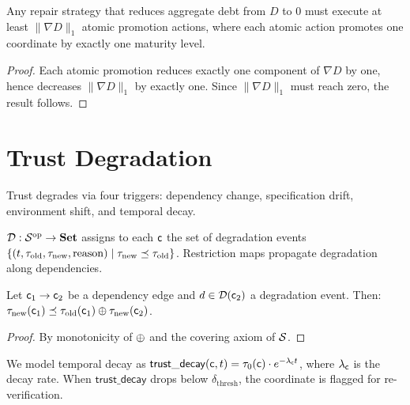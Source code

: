 \documentclass[11pt]{article}
\newcommand{\TrustDecay}{\mathsf{trust\_decay}}
\newcommand{\DebtThreshold}{\delta_{\mathrm{thresh}}}
\begin{document}
\begin{lemma}\label{lem:repair-lower}
Any repair strategy that reduces aggregate debt from $D$ to $0$ must
execute at least $\|\nabla D\|_1$ atomic promotion actions, where each
atomic action promotes one coordinate by exactly one maturity level.
\end{lemma}

\begin{proof}
Each atomic promotion reduces exactly one component of $\nabla D$ by
one, hence decreases $\|\nabla D\|_1$ by exactly one.  Since
$\|\nabla D\|_1$ must reach zero, the result follows.
\end{proof}



\section{Trust Degradation}\label{sec:trust-degradation}

Trust degrades via four triggers: dependency change, specification
drift, environment shift, and temporal decay.

\begin{definition}\label{def:degrade}
$\mathcal{D} : \mathcal{S}^{\mathrm{op}} \to \mathbf{Set}$ assigns to each
$\mathsf{c}$ the set of degradation events
$\{(t, \tau_{\mathrm{old}}, \tau_{\mathrm{new}}, \mathrm{reason})
\mid \tau_{\mathrm{new}} \preceq \tau_{\mathrm{old}}\}$.
Restriction maps propagate degradation along dependencies.
\end{definition}

\begin{theorem}\label{thm:degrade-prop}
Let $\mathsf{c}_1 \to \mathsf{c}_2$ be a dependency edge and
$d \in \mathcal{D}(\mathsf{c}_2)$ a degradation event.  Then:
$\tau_{\mathrm{new}}(\mathsf{c}_1) \preceq \tau_{\mathrm{old}}(\mathsf{c}_1)
\oplus \tau_{\mathrm{new}}(\mathsf{c}_2)$.
\end{theorem}

\begin{proof}
By monotonicity of $\oplus$ and the covering axiom of $\mathcal{S}$.
\end{proof}

We model temporal decay as $\TrustDecay(\coord, t) = \tau_0(\coord)
\cdot e^{-\lambda_\coord t}$, where $\lambda_{\mathsf{c}}$ is the decay
rate.  When $\TrustDecay$ drops below $\DebtThreshold$, the
coordinate is flagged for re-verification.
\end{document}
